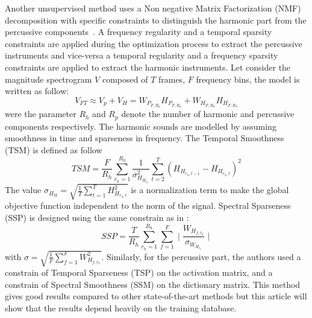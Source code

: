 Another unsupervised method uses a Non negative Matrix Factorization (NMF) decomposition with specific constraints to distinguish the harmonic part from the percussive components~\cite{canadas2014percussive}. A frequency regularity and a temporal sparsity constraints are applied during the optimization process to extract the percussive instruments and vice-versa a temporal regularity and a frequency sparsity constraints are applied to extract the harmonic instruments. Let consider the magnitude spectrogram $V$ composed of $T$ frames, $F$ frequency bins, the model is written as follow:
$$ V_{FT} \approx V_p + V_H = W_{P_{F,R_p}} H_{P_{F,R_p}} + W_{H_{F,R_h}} H_{H_{F,R_h}} $$
were the parameter $R_h$ and $R_p$ denote the number of harmonic and percussive components respectively. The harmonic sounds are modelled by assuming smoothness in time and sparseness in frequency. The Temporal Smoothness (TSM) is defined as follow 
\begin{equation}
TSM = \frac{F}{R_h} \sum_{r_h=1}^{R_h}\frac{1}{\sigma_{H_{H_{r_h}}}^2} \sum_{t=2}^{T}(H_{H_{r_h,t-1}} - H_{H_{r_h,t}})^2
\end{equation}
The value $\sigma_{H_{H}} = \sqrt{\frac{1}{T} \sum_{t=1}^{T} H_{H_{r_h,t}}^2 }$ is a normalization term to make the global objective function independent to the norm of the signal. Spectral Sparseness (SSP) is designed using the same constrain as in \cite{Virtanen}:
\begin{equation}
SSP = \frac{T}{R_h} \sum_{r_h=1}^{R_h}\sum_{f=1}^{F} \mid\frac{W_{H_{f,r_h}}}{\sigma_{W_{H_{r_h}}}}\mid
\end{equation}
with $\sigma = \sqrt{\frac{1}{F} \sum_{f=1}^{F} W_{H_{f,r_h}}^2 }$.
Similarly, for the percussive part, the authors used a constrain of Temporal Sparseness (TSP) on the activation matrix, and a constrain of Spectral Smoothness (SSM) on the dictionary matrix. 
This method gives good results compared to other state-of-the-art methods but this article will show that the results depend heavily on the training database.
